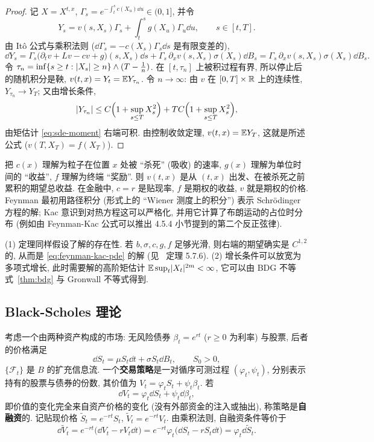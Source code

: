 \begin{proof}
记 $X=X^{t,x}$, $\Gamma_s=e^{-\int_t^sc(X_u)\dd u}\in(0,1]$, 并令
\[
Y_s=v(s,X_s)\Gamma_s+\int_t^sg(X_u)\Gamma_u\dd u,\qquad s\in[t,T].
\]
由 It\^o 公式与乘积法则 ($\dd\Gamma_s=-c(X_s)\Gamma_s\dd s$ 是有限变差的),
\[
\dd Y_s=\Gamma_s\big(\partial_tv+Lv-cv+g\big)(s,X_s)\dd s+\Gamma_s\,\partial_xv(s,X_s)\sigma(X_s)\dd B_s=\Gamma_s\,\partial_xv(s,X_s)\sigma(X_s)\dd B_s.
\]
令 $\tau_n=\inf\{s\ge t:\lvert X_s\rvert\ge n\}\wedge(T-\frac{1}{n})$. 在 $[t,\tau_n]$ 上被积过程有界, 所以停止后的随机积分是鞅, $v(t,x)=Y_t=\mathbb{E} Y_{\tau_n}$. 令 $n\to\infty$: 由 $v$ 在 $[0,T]\times\mathbb{R}$ 上的连续性, $Y_{\tau_n}\to Y_T$; 又由增长条件,
\[
\lvert Y_{\tau_n}\rvert\le C\Big(1+\sup_{s\le T}X_s^2\Big)+TC\Big(1+\sup_{s\le T}X_s^2\Big),
\]
由矩估计 \eqref{eq:sde-moment} 右端可积. 由控制收敛定理, $v(t,x)=\mathbb{E} Y_T$, 这就是所述公式 ($v(T,X_T)=f(X_T)$).
\end{proof}

\begin{intuition}
把 $c(x)$ 理解为粒子在位置 $x$ 处被 ``杀死'' (吸收) 的速率, $g(x)$ 理解为单位时间的 ``收益'', $f$ 理解为终端 ``奖励''. 则 $v(t,x)$ 是从 $(t,x)$ 出发、在被杀死之前累积的期望总收益. 在金融中, $c=r$ 是贴现率, $f$ 是期权的收益, $v$ 就是期权的价格. Feynman 最初用路径积分 (形式上的 ``Wiener 测度上的积分'') 表示 Schr\"odinger 方程的解; Kac 意识到对热方程这可以严格化, 并用它计算了布朗运动的占位时分布 (例如由 Feynman-Kac 公式可以推出 4.5.4 小节提到的第二个反正弦律).
\end{intuition}

\begin{remark}
(1) 定理同样假设了解的存在性. 若 $b,\sigma,c,g,f$ 足够光滑, 则右端的期望确实是 $C^{1,2}$ 的, 从而是 \eqref{eq:feynman-kac-pde} 的解 (见~\cite{karatzas} 定理 5.7.6). (2) 增长条件可以放宽为多项式增长, 此时需要解的高阶矩估计 $\mathbb{E}\sup_t\lvert X_t\rvert^{2m}<\infty$, 它可以由 BDG 不等式~\ref{thm:bdg} 与 Gronwall 不等式得到.
\end{remark}

\subsection{Black-Scholes 理论}

考虑一个由两种资产构成的市场: 无风险债券 $\beta_t=e^{rt}$ ($r\ge0$ 为利率) 与股票, 后者的价格满足
\[
\dd S_t=\mu S_t\dd t+\sigma S_t\dd B_t,\qquad S_0>0,
\]
$\{\mathcal{F}_t\}$ 是 $B$ 的扩充信息流. 一个\textbf{交易策略}是一对循序可测过程 $(\varphi_t,\psi_t)$, 分别表示持有的股票与债券的份数, 其价值为 $V_t=\varphi_tS_t+\psi_t\beta_t$. 若
\begin{equation}\label{eq:self-financing}
\dd V_t=\varphi_t\dd S_t+\psi_t\dd\beta_t,
\end{equation}
即价值的变化完全来自资产价格的变化 (没有外部资金的注入或抽出), 称策略是\textbf{自融资}的. 记贴现价格 $\widetilde{S}_t=e^{-rt}S_t$, $\widetilde{V}_t=e^{-rt}V_t$. 由乘积法则, 自融资条件等价于
\begin{equation}\label{eq:self-financing-discounted}
\dd\widetilde{V}_t=e^{-rt}\big(\dd V_t-rV_t\dd t\big)=e^{-rt}\varphi_t\big(\dd S_t-rS_t\dd t\big)=\varphi_t\dd\widetilde{S}_t.
\end{equation}

